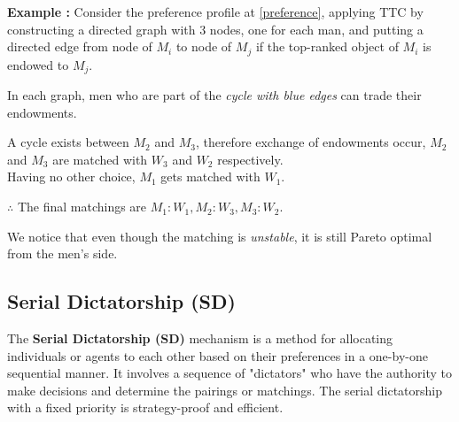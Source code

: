 \documentclass[a4paper,11pt,table]{article}
\theoremstyle{definition}
\theoremstyle{remark}
\begin{document}
\textbf{Example :} Consider the preference profile at \ref{preference}, applying TTC by constructing a directed graph with 3 nodes, one for each man, and putting a directed edge from node of $M_i$ to node of $M_j$ if the top-ranked object of $M_i$ is endowed to $M_j$.

In each graph, men who are part of the \textit{cycle with blue edges} can trade their endowments.\\

\begin{center}
\end{center}
A cycle exists between $M_2$ and $M_3$, therefore exchange of endowments occur, $M_2$ and $M_3$ are matched with $W_3$ and $W_2$ respectively.\\
Having no other choice, $M_1$ gets matched with $W_1$.

$\therefore$ The final matchings are {$M_1:W_1, M_2:W_3, M_3:W_2$}.

We notice that even though the matching is \textit{unstable}, it is still Pareto optimal from the men's side.

\subsection{Serial Dictatorship (SD)}

 The \textbf{Serial Dictatorship (SD)} mechanism is a method for allocating individuals or agents to each other based on their preferences in a one-by-one sequential manner. It involves a sequence of "dictators" who have the authority to make decisions and determine the pairings or matchings. The serial dictatorship with a fixed priority is strategy-proof and efficient.
\end{document}
